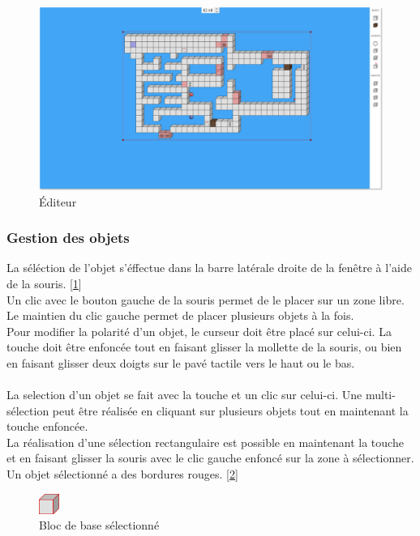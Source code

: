 {{{{\begin{figure} [!h]
    \centerline {\includegraphics[width=13cm]{figures/editeur.png}}
    \caption {Éditeur}
    \label {fig:ED}
\end{figure}

\subsubsection {Gestion des objets}

La séléction de l'objet s'éffectue dans la barre latérale droite de la fenêtre à l'aide de la souris. [\ref{fig:ED}] \\
Un clic avec le bouton gauche de la souris permet de le placer sur un zone libre.
Le maintien du clic gauche permet de placer plusieurs objets à la fois.\\

Pour modifier la polarité d'un objet, le curseur doit être placé sur celui-ci. La touche  doit être enfoncée tout en faisant glisser la mollette de la souris, ou bien en faisant glisser deux doigts sur le pavé tactile vers le haut ou le bas. \\
\\

La selection d'un objet se fait avec la touche  et un clic sur celui-ci. Une multi-sélection peut être réalisée en cliquant sur plusieurs objets tout en maintenant la touche  enfoncée. \\
La réalisation d'une sélection rectangulaire est possible en maintenant la touche  et en faisant glisser la souris avec le clic gauche enfoncé sur la zone à sélectionner. \\
Un objet sélectionné a des bordures rouges. [\ref{fig:BBS}]\\

\begin{figure} [!h]
    \centerline {\includegraphics[width=25px]{figures/block_selection.png}}
    \caption {Bloc de base sélectionné}
    \label {fig:BBS}
\end{figure}

}}}}
